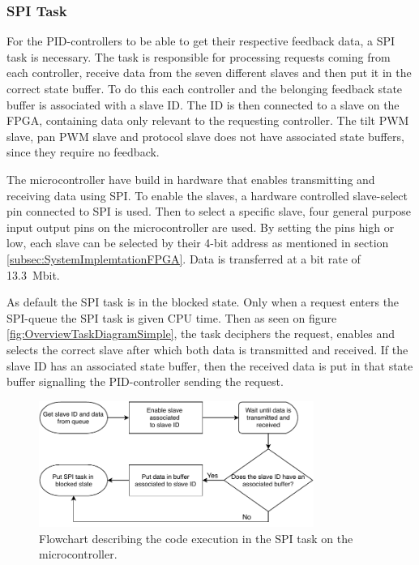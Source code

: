 \documentclass[../../main.tex]{subfiles}
\begin{document}
\subsubsection*{SPI Task}
For the PID-controllers to be able to get their respective feedback data, a SPI task is necessary. The task is responsible for processing requests coming from each controller, receive data from the seven different slaves and then put it in the correct state buffer. To do this each controller and the belonging feedback state buffer is associated with a slave ID. The ID is then connected to a slave on the FPGA, containing data only relevant to the requesting controller. The tilt PWM slave, pan PWM slave and protocol slave does not have associated state buffers, since they require no feedback. 

The microcontroller have build in hardware that enables transmitting and receiving data using SPI. To enable the slaves, a hardware controlled slave-select pin connected to SPI is used. Then to select a specific slave, four general purpose input output pins on the microcontroller are used. By setting the pins high or low, each slave can be selected by their 4-bit address as mentioned in section \ref{subsec:SystemImplemtationFPGA}. Data is transferred at a bit rate of \SI{13.3}{\mega bit}.

As default the SPI task is in the blocked state. Only when a request enters the SPI-queue the SPI task is given CPU time. Then as seen on figure \ref{fig:OverviewTaskDiagramSimple}, the task deciphers the request, enables and selects the correct slave after which both data is transmitted and received. If the slave ID has an associated state buffer, then the received data is put in that state buffer signalling the PID-controller sending the request.    

\begin{figure}[H]
    \centering
    \includegraphics[width=0.8\textwidth]{Sections/System_Implementation/Images/SPIFlowchart.pdf}
    \caption{Flowchart describing the code execution in the SPI task on the microcontroller.}
    \label{fig:SPIFlowchart}
\end{figure}
\end{document}

